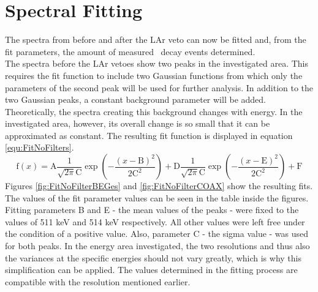 \documentclass[encoding=utf8,british]{tumphthesis}
\begin{document}

\section{Spectral Fitting}
\label{sec:Fitting}

The spectra from before and after the LAr veto can now be fitted and, from the fit parameters, the amount of measured \Kr\ decay events determined.
\\

The spectra before the LAr vetoes show two peaks in the investigated area.
This requires the fit function to include two Gaussian functions from which only the parameters of the second peak will be used for further analysis.
In addition to the two Gaussian peaks, a constant background parameter will be added.
Theoretically, the  spectra creating this background changes with energy.
In the investigated area, however, its overall change is so small that it can be approximated as constant. 
The resulting fit function is displayed in equation \ref{equ:FitNoFilters}.
\begin{equation}
\mathrm{f}(x) = \mathrm{A}\frac{1}{\sqrt{2\pi}\mathrm{C}}\exp\left(-\frac{(x-\mathrm{B})^2}{2\mathrm{C}^2}\right) + \mathrm{D}\frac{1}{\sqrt{2\pi}\mathrm{C}}\exp\left(-\frac{(x-\mathrm{E})^2}{2\mathrm{C}^2}\right) + \mathrm{F}
\label{equ:FitNoFilters}
\end{equation}
Figures \ref{fig:FitNoFilterBEGes} and \ref{fig:FitNoFilterCOAX} show the resulting fits.
The values of the fit parameter values can be seen in the table inside the figures.
Fitting parameters B and E - the mean values of the peaks - were fixed to the values of 511 keV and 514 keV respectively.
All other values were left free under the condition of a positive value.
Also, parameter C - the sigma value - was used for both peaks.
In the energy area investigated, the two resolutions and thus also the variances at the specific energies should not vary greatly, which is why this simplification can be applied.
The values determined in the fitting process are compatible with the resolution mentioned earlier. 
\\
\end{document}
